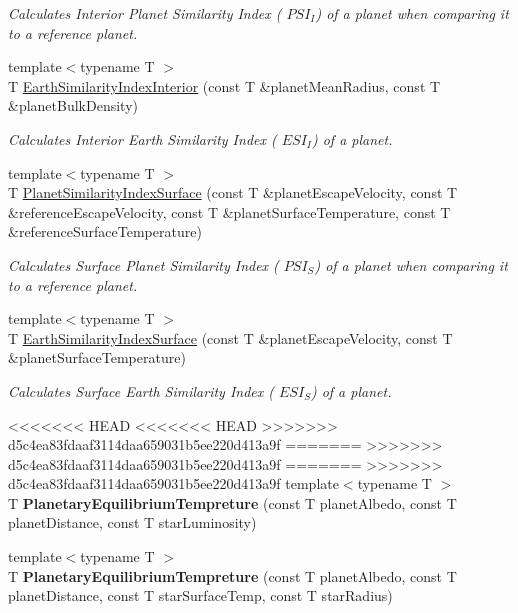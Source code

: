 \begin{DoxyCompactItemize}
\begin{DoxyCompactList}\small\item\em Calculates Interior Planet Similarity Index ( $PSI_I$) of a planet when comparing it to a reference planet. \end{DoxyCompactList}\item 
{\footnotesize template$<$typename T $>$ }\\T \hyperlink{group___astrophysics_ga699bcc2f17b8855eaa856595d8032f61}{Earth\+Similarity\+Index\+Interior} (const T \&planet\+Mean\+Radius, const T \&planet\+Bulk\+Density)
\begin{DoxyCompactList}\small\item\em Calculates Interior Earth Similarity Index ( $ESI_I$) of a planet. \end{DoxyCompactList}\item 
{\footnotesize template$<$typename T $>$ }\\T \hyperlink{group___astrophysics_gae0c7dce2779d66b0560ca388a34ddc39}{Planet\+Similarity\+Index\+Surface} (const T \&planet\+Escape\+Velocity, const T \&reference\+Escape\+Velocity, const T \&planet\+Surface\+Temperature, const T \&reference\+Surface\+Temperature)
\begin{DoxyCompactList}\small\item\em Calculates Surface Planet Similarity Index ( $PSI_S$) of a planet when comparing it to a reference planet. \end{DoxyCompactList}\item 
{\footnotesize template$<$typename T $>$ }\\T \hyperlink{group___astrophysics_ga1df772b0ed354ca7f7e4a7a4af072325}{Earth\+Similarity\+Index\+Surface} (const T \&planet\+Escape\+Velocity, const T \&planet\+Surface\+Temperature)
\begin{DoxyCompactList}\small\item\em Calculates Surface Earth Similarity Index ( $ESI_S$) of a planet. \end{DoxyCompactList}\item 
<<<<<<< HEAD
<<<<<<< HEAD
>>>>>>> d5c4ea83fdaaf3114daa659031b5ee220d413a9f
=======
>>>>>>> d5c4ea83fdaaf3114daa659031b5ee220d413a9f
=======
>>>>>>> d5c4ea83fdaaf3114daa659031b5ee220d413a9f
{\footnotesize template$<$typename T $>$ }\\T {\bfseries Planetary\+Equilibrium\+Tempreture} (const T planet\+Albedo, const T planet\+Distance, const T star\+Luminosity)
\item 
{\footnotesize template$<$typename T $>$ }\\T {\bfseries Planetary\+Equilibrium\+Tempreture} (const T planet\+Albedo, const T planet\+Distance, const T star\+Surface\+Temp, const T star\+Radius)

\end{DoxyCompactItemize}
